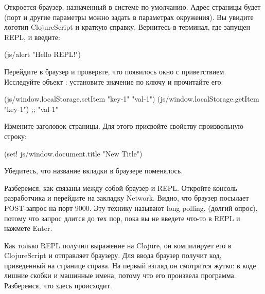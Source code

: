 Откроется браузер, назначенный в системе по умолчанию. Адрес страницы будет  (порт и другие параметры можно задать в параметрах окружения). Вы увидите логотип ClojureScript и краткую справку. Вернитесь в терминал, где запущен REPL, и введите:

\begin{english}
  \begin{clojure}
(js/alert "Hello REPL!")
  \end{clojure}
\end{english}

Перейдите в браузер и проверьте, что появилось окно с приветствием. Исследуйте объект : установите значение по ключу и прочитайте его:

\begin{english}
  \begin{clojure}
(js/window.localStorage.setItem "key-1" "val-1")
(js/window.localStorage.getItem "key-1")
;; "val-1"
  \end{clojure}
\end{english}

Измените заголовок страницы. Для этого присвойте свойству  произвольную строку:

\begin{english}
  \begin{clojure}
(set! js/window.document.title "New Title")
  \end{clojure}
\end{english}

\noindent
Убедитесь, что название вкладки в браузере поменялось.

Разберемся, как связаны между собой браузер и REPL. Откройте консоль разработчика и перейдите на закладку Network. Видно, что браузер посылает POST-запрос на порт 9000. Эту технику называют long polling, (долгий опрос), потому что запрос длится до тех пор, пока вы не введете что-то в REPL и нажмете Enter.

Как только REPL получил выражение на Clojure, он компилирует его в ClojureScript и отправляет браузеру. Для ввода  браузер получит код, приведенный на странице справа. На первый взгляд он смотрится жутко: в коде лишние скобки и машинные имена, потому что его произвела программа. Разберемся, что здесь происходит.


